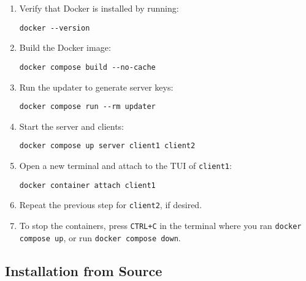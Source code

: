 \begin{enumerate}
    \item Verify that Docker is installed by running:

        \begin{lstlisting}
docker --version
        \end{lstlisting}

    \item Build the Docker image:

        \begin{lstlisting}
docker compose build --no-cache
        \end{lstlisting}

    \item Run the updater to generate server keys:

        \begin{lstlisting}
docker compose run --rm updater
        \end{lstlisting}

    \item Start the server and clients:

        \begin{lstlisting}
docker compose up server client1 client2
        \end{lstlisting}

    \item Open a new terminal and attach to the TUI of \texttt{client1}:

        \begin{lstlisting}
docker container attach client1
        \end{lstlisting}

    \item Repeat the previous step for \texttt{client2}, if desired.

    \item To stop the containers, press \texttt{CTRL+C} in the terminal where you ran \texttt{docker compose up}, or run \texttt{docker compose down}.

\end{enumerate}

\subsection{Installation from Source}
\label{sec:source}

